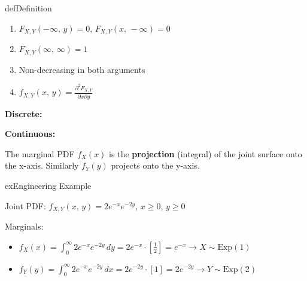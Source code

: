 
\begin{PSbox}[unbreakable]{def}{Definition}


\end{PSbox}


\begin{enumerate}
\def\labelenumi{\arabic{enumi}.}
\tightlist
\item
  $F_{X,Y}(-\infty,\, y) = 0,\, F_{X,Y}(x,\, -\infty) = 0$
\item
  $F_{X,Y}(\infty,\, \infty) = 1$
\item
  Non-decreasing in both arguments
\item
  $\displaystyle f_{X,Y}(x,\,y) = \frac{\partial^{2}F_{X,Y}}{\partial x \partial y}$
\end{enumerate}



\textbf{Discrete:}

\textbf{Continuous:}


The marginal PDF $f_{X}(x)$ is the \textbf{projection} (integral) of the joint surface onto the x-axis. Similarly $f_{Y}(y)$ projects onto the y-axis.

\begin{PSbox}[unbreakable]{ex}{Engineering Example}

Joint PDF: $f_{X,Y}(x,\,y) = 2e^{-x}e^{-2y},\, x \ge 0,\, y \ge 0$

Marginals:

\begin{itemize}
\tightlist
\item
  $\displaystyle f_{X}(x) = \int_{0}^{\infty} 2e^{-x}e^{-2y}\,dy = 2e^{-x} \cdot \left[\frac{1}{2}\right] = e^{-x} \to X \sim \mathrm{Exp}(1)$
\item
  $f_{Y}(y) = \int_{0}^{\infty} 2e^{-x}e^{-2y}\,dx = 2e^{-2y} \cdot [1] = 2e^{-2y} \to Y \sim \mathrm{Exp}(2)$
\end{itemize}

\end{PSbox}

